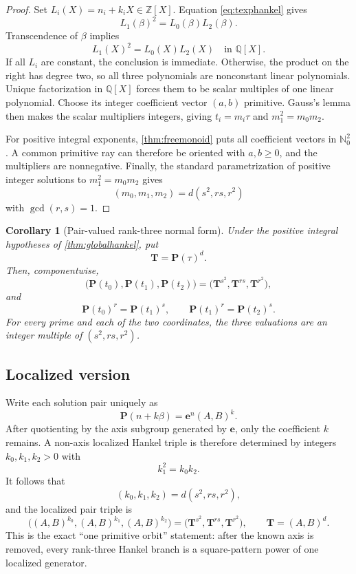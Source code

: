 \documentclass[11pt]{article}
\numberwithin{equation}{section}
\newtheorem{corollary}[theorem]{Corollary}
\theoremstyle{definition}
\newcommand{\Q}{\mathbb{Q}}
\newcommand{\Z}{\mathbb{Z}}
\newcommand{\N}{\mathbb{N}}
\newcommand{\Pair}{\mathbf P}
\newcommand{\axis}{\mathbf e}
\begin{document}
\begin{proof}
Set \(L_i(X)=n_i+k_iX\in\Z[X]\). Equation \eqref{eq:texphankel} gives
\[
       L_1(\beta)^2=L_0(\beta)L_2(\beta).
\]
Transcendence of \(\beta\) implies
\[
       L_1(X)^2=L_0(X)L_2(X)
       \quad\text{in }\Q[X].
\]
If all \(L_i\) are constant, the conclusion is immediate. Otherwise, the product on the right has degree two, so all three polynomials are nonconstant linear polynomials. Unique factorization in \(\Q[X]\) forces them to be scalar multiples of one linear polynomial. Choose its integer coefficient vector \((a,b)\) primitive. Gauss's lemma then makes the scalar multipliers integers, giving \(t_i=m_i\tau\) and \(m_1^2=m_0m_2\).

For positive integral exponents, \cref{thm:freemonoid} puts all coefficient vectors in \(\N_0^2\). A common primitive ray can therefore be oriented with \(a,b\ge0\), and the multipliers are nonnegative. Finally, the standard parametrization of positive integer solutions to \(m_1^2=m_0m_2\) gives
\[
       (m_0,m_1,m_2)=d(s^2,rs,r^2)
\]
with \(\gcd(r,s)=1\).
\end{proof}

\begin{corollary}[Pair-valued rank-three normal form]\label{cor:pairhankel}
Under the positive integral hypotheses of \cref{thm:globalhankel}, put
\[
       \mathbf T=\Pair(\tau)^d.
\]
Then, componentwise,
\begin{equation}\label{eq:pairpattern}
       \bigl(\Pair(t_0),\Pair(t_1),\Pair(t_2)\bigr)
       =\bigl(\mathbf T^{s^2},\mathbf T^{rs},\mathbf T^{r^2}\bigr),
\end{equation}
and
\[
       \Pair(t_0)^r=\Pair(t_1)^s,
       \qquad
       \Pair(t_1)^r=\Pair(t_2)^s.
\]
For every prime and each of the two coordinates, the three valuations are an integer multiple of \((s^2,rs,r^2)\).
\end{corollary}

\subsection{Localized version}

Write each solution pair uniquely as
\[
       \Pair(n+k\beta)=\axis^n(A,B)^k.
\]
After quotienting by the axis subgroup generated by \(\axis\), only the coefficient \(k\) remains. A non-axis localized Hankel triple is therefore determined by integers \(k_0,k_1,k_2>0\) with
\[
       k_1^2=k_0k_2.
\]
It follows that
\[
       (k_0,k_1,k_2)=d(s^2,rs,r^2),
\]
and the localized pair triple is
\[
  \bigl((A,B)^{k_0},(A,B)^{k_1},(A,B)^{k_2}\bigr)
   =\bigl(\mathbf T^{s^2},\mathbf T^{rs},\mathbf T^{r^2}\bigr),
  \qquad \mathbf T=(A,B)^d.
\]
This is the exact ``one primitive orbit'' statement: after the known axis is removed, every rank-three Hankel branch is a square-pattern power of one localized generator.
\end{document}
